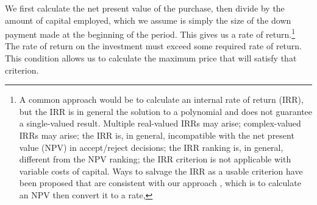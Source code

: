 We first calculate the net present value of the purchase, then divide by the amount of capital employed, which we assume is simply the size of the down payment made at the beginning of the period. This gives us a rate of return.\footnote{A common approach would be to calculate an internal rate of return (IRR), but  the IRR is in general the solution to a polynomial and does not guarantee a single-valued result.\cite{robinsonOPTIMALTERMINATIONIRR1996} Multiple real-valued  IRRs may arise;  complex-valued IRRs may arise;  the IRR is, in general, incompatible with the net present value (NPV) in accept/reject decisions; the IRR ranking is, in general, different from the NPV ranking; the IRR criterion is not applicable with variable costs of capital. Ways to salvage the IRR as a usable criterion have been proposed that are consistent with our approach \cite{magniAverageInternalRate2010}, which is to calculate an NPV then convert it to a rate,} 
The rate of return on the investment must exceed some required rate of return. This condition allows us to calculate the maximum price that will satisfy that criterion.










